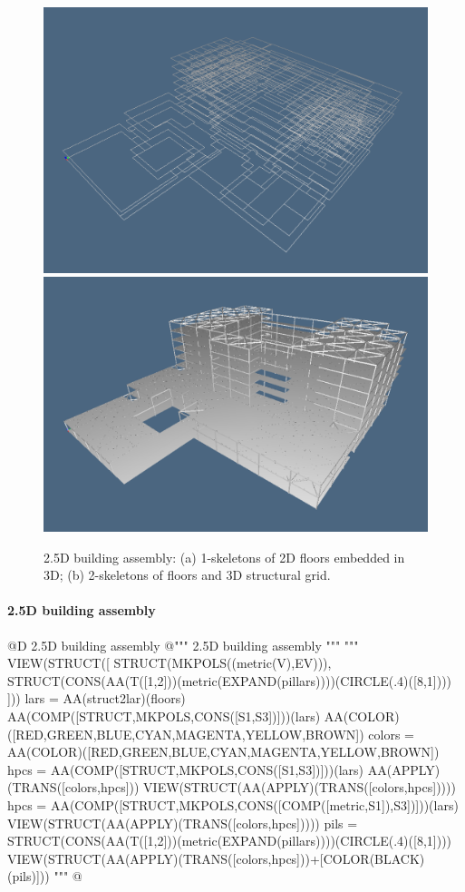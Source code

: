 \documentclass[11pt,oneside]{article}    %
\begin{document}
\begin{figure}[htbp] %
   \centering
   \includegraphics[height=0.35\linewidth,width=0.495\linewidth]{images/floor3D} 
   \includegraphics[height=0.35\linewidth,width=0.495\linewidth]{images/floor3Da} 
   \caption{2.5D building assembly: (a) 1-skeletons of 2D floors embedded in 3D; (b) 2-skeletons of floors and 3D structural grid.}
   \label{fig:example}
\end{figure}




\paragraph{2.5D building assembly}
@D 2.5D building assembly
@{""" 2.5D building assembly """    
"""    
VIEW(STRUCT([ STRUCT(MKPOLS((metric(V),EV))), STRUCT(CONS(AA(T([1,2]))(metric(EXPAND(pillars))))(CIRCLE(.4)([8,1]))) ]))
lars = AA(struct2lar)(floors)
AA(COMP([STRUCT,MKPOLS,CONS([S1,S3])]))(lars)
AA(COLOR)([RED,GREEN,BLUE,CYAN,MAGENTA,YELLOW,BROWN])
colors = AA(COLOR)([RED,GREEN,BLUE,CYAN,MAGENTA,YELLOW,BROWN])
hpcs = AA(COMP([STRUCT,MKPOLS,CONS([S1,S3])]))(lars)
AA(APPLY)(TRANS([colors,hpcs]))
VIEW(STRUCT(AA(APPLY)(TRANS([colors,hpcs]))))
hpcs = AA(COMP([STRUCT,MKPOLS,CONS([COMP([metric,S1]),S3])]))(lars)
VIEW(STRUCT(AA(APPLY)(TRANS([colors,hpcs]))))
pils = STRUCT(CONS(AA(T([1,2]))(metric(EXPAND(pillars))))(CIRCLE(.4)([8,1])))
VIEW(STRUCT(AA(APPLY)(TRANS([colors,hpcs]))+[COLOR(BLACK)(pils)]))
"""
@}
\end{document}
